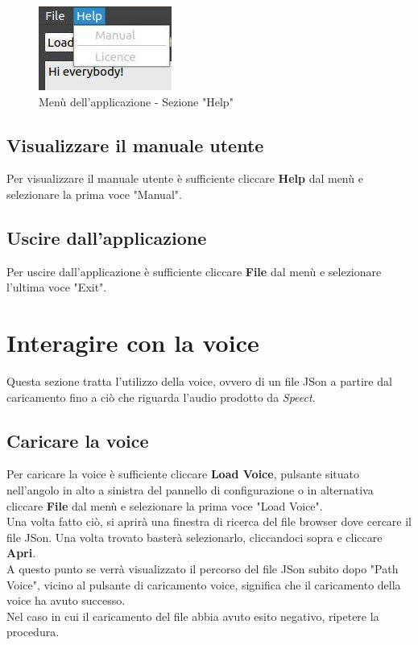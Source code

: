 \documentclass[openany,12pt,a4paper]{report}
\begin{document}
\begin{itemize}
\begin{figure}[H]
		\centering
		
			\includegraphics[width=.4\textwidth]{./img/menu_help}
		
		\caption{Menù dell'applicazione - Sezione "Help"}
		
	\end{figure}

	\end{itemize}
	
	\subsection{Visualizzare il manuale utente}
	Per visualizzare il manuale utente è sufficiente cliccare \textbf{Help} dal menù e selezionare la prima voce "Manual". 
	
	\subsection{Uscire dall'applicazione}
	Per uscire dall'applicazione è sufficiente cliccare \textbf{File} dal menù e selezionare l'ultima voce "Exit". 
	
	\section{Interagire con la voice}
	Questa sezione tratta l'utilizzo della voice, ovvero di un file JSon a partire dal caricamento fino a ciò che riguarda l'audio prodotto da \textit{Speect}.
	
	\subsection{Caricare la voice}
	Per caricare la voice è sufficiente cliccare \textbf{Load Voice}, pulsante situato nell'angolo in alto a sinistra del pannello di configurazione o in alternativa cliccare \textbf{File} dal menù e selezionare la prima voce "Load Voice".\\
	Una volta fatto ciò, si aprirà una finestra di ricerca del file browser dove cercare il file JSon. Una volta trovato basterà selezionarlo, cliccandoci sopra e cliccare \textbf{Apri}.\\
	A questo punto se verrà visualizzato il percorso del file JSon subito dopo "Path Voice", vicino al pulsante di caricamento voice, significa che il caricamento della voice ha avuto successo.\\
	Nel caso in cui il caricamento del file abbia avuto esito negativo, ripetere la procedura.
	
\end{document}
